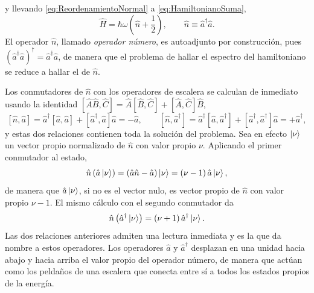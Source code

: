         y llevando \eqref{eq:ReordenamientoNormal} a \eqref{eq:HamiltonianoSuma},
        \begin{equation}\label{eq:HamiltonianoNumero}
            \boxed{\;\hat{H} = \hbar\omega\left(\hat{n} + \frac{1}{2}\right),\qquad \hat{n}\equiv\hat{a}^{\dagger}\hat{a} .\;}
        \end{equation}
        El operador $\hat{n}$, llamado \textit{operador número}, es autoadjunto por construcción, pues $\left(\hat{a}^{\dagger}\hat{a}\right)^{\dagger} = \hat{a}^{\dagger}\hat{a}$, de manera que el problema de hallar el espectro del hamiltoniano se reduce a hallar el de $\hat{n}$.

        Los conmutadores de $\hat{n}$ con los operadores de escalera se calculan de inmediato usando la identidad $[\hat{A}\hat{B},\hat{C}] = \hat{A}[\hat{B},\hat{C}] + [\hat{A},\hat{C}]\hat{B}$,
        \begin{equation}\label{eq:ConmutadorNA}
            \left[\hat{n},\hat{a}\right] = \hat{a}^{\dagger}\left[\hat{a},\hat{a}\right] + \left[\hat{a}^{\dagger},\hat{a}\right]\hat{a} = -\hat{a},
            \qquad
            \left[\hat{n},\hat{a}^{\dagger}\right] = \hat{a}^{\dagger}\left[\hat{a},\hat{a}^{\dagger}\right] + \left[\hat{a}^{\dagger},\hat{a}^{\dagger}\right]\hat{a} = +\hat{a}^{\dagger},
        \end{equation}
        y estas dos relaciones contienen toda la solución del problema. Sea en efecto $\ket{\nu}$ un vector propio normalizado de $\hat{n}$ con valor propio $\nu$. Aplicando el primer conmutador al estado,
        \begin{equation}\label{eq:BajaEscalera}
            \hat{n}\left(\hat{a}\ket{\nu}\right) = \left(\hat{a}\hat{n} - \hat{a}\right)\ket{\nu} = \left(\nu-1\right)\hat{a}\ket{\nu},
        \end{equation}
        de manera que $\hat{a}\ket{\nu}$, si no es el vector nulo, es vector propio de $\hat{n}$ con valor propio $\nu-1$. El mismo cálculo con el segundo conmutador da
        \begin{equation}\label{eq:SubeEscalera}
            \hat{n}\left(\hat{a}^{\dagger}\ket{\nu}\right) = \left(\nu+1\right)\hat{a}^{\dagger}\ket{\nu} .
        \end{equation}
        Las dos relaciones anteriores admiten una lectura inmediata y es la que da nombre a estos operadores. Los operadores $\hat{a}$ y $\hat{a}^{\dagger}$ desplazan en una unidad hacia abajo y hacia arriba el valor propio del operador número, de manera que actúan como los peldaños de una escalera que conecta entre sí a todos los estados propios de la energía.

